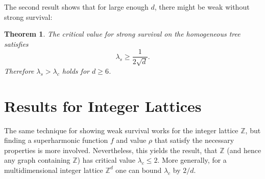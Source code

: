 \documentclass[a4paper,11pt]{amsart}
\theoremstyle{theorem}
\newtheorem{theorem}{Theorem}
\theoremstyle{definition}
\newcommand{\Z}{\mathbb{Z}}
\begin{document}
The second result shows that for large enough $d$, there might be weak without strong survival:
\begin{theorem}
	The critical value for strong survival on the homogeneous tree satisfies $$\lambda_s \geq \frac{1}{2\sqrt{d}}.$$
	Therefore $\lambda_s > \lambda_c$ holds for $d\geq 6$.
\end{theorem}

\section{Results for Integer Lattices}

The same technique for showing weak survival works for the integer lattice $\Z$, but finding a superharmonic function $f$ and value $\rho$ that satisfy the necessary properties is more involved. Nevertheless, this yields the result, that $\Z$ (and hence any graph containing $\Z$) has critical value $\lambda_c\leq 2$.
More generally, for a multidimensional integer lattice $\Z^d$ one can bound $\lambda_c$ by $2/d$.
\end{document}
